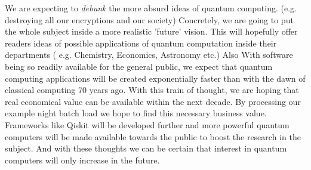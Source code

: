 We are expecting to \emph{debunk} the more absurd ideas of quantum computing. (e.g. destroying all our encryptions and our society) Concretely, we are going to put the whole subject inside a more realistic 'future' vision. This will hopefully offer readers ideas of possible applications of quantum computation inside their departments ( e.g. Chemistry, Economics, Astronomy etc.) Also With software being so readily available for the general public, we expect that quantum computing applications will be created exponentially faster than with the dawn of classical computing 70 years ago. With this train of thought, we are hoping that real economical value can be available within the next decade. By processing our example night batch load we hope to find this necessary business value. Frameworks like Qiskit will be developed further and more powerful quantum computers will be made available towards the public to boost the research in the subject. And with these thoughts we can be certain that interest in quantum computers will only increase in the future.

